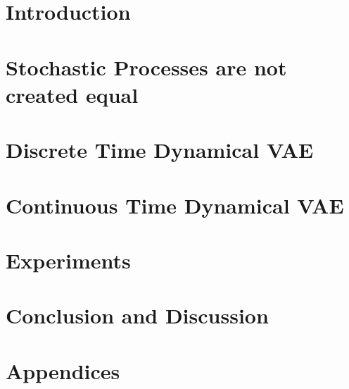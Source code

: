 \documentclass[twoside,11pt]{report}
\begin{document}
\part{Introduction}
    
    
    
    

\part{Stochastic Processes are not created equal}

    
    

\part{Discrete Time Dynamical VAE}

    
    
    
    
    

\part{Continuous Time Dynamical VAE}

    
    
    

\part{Experiments}

    

\part{Conclusion and Discussion}

    
    
    

\part{Appendices}
\begin{appendices}
    
\end{appendices}

\clearpage

\printglossary
\clearpage


\printbibliography
\clearpage
\end{document}
